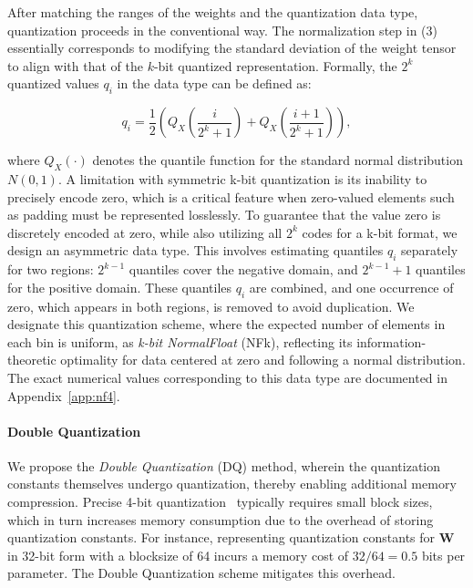 After matching the ranges of the weights and the quantization data type, quantization proceeds in the conventional way. The normalization step in (3) essentially corresponds to modifying the standard deviation of the weight tensor to align with that of the $k$-bit quantized representation. Formally, the $2^k$ quantized values $q_i$ in the data type can be defined as:

\begin{equation}
q_i  = \frac{1}{2}\left( Q_X\left(\frac{i}{2^k+1}\right) + Q_X\left(\frac{i+1}{2^k+1}\right)\right),
\end{equation}

where $Q_X(\cdot)$ denotes the quantile function for the standard normal distribution $N(0,1)$. A limitation with symmetric k-bit quantization is its inability to precisely encode zero, which is a critical feature when zero-valued elements such as padding must be represented losslessly. To guarantee that the value zero is discretely encoded at zero, while also utilizing all $2^k$ codes for a k-bit format, we design an asymmetric data type. This involves estimating quantiles $q_i$ separately for two regions: $2^{k-1}$ quantiles cover the negative domain, and $2^{k-1} + 1$ quantiles for the positive domain. These quantiles $q_i$ are combined, and one occurrence of zero, which appears in both regions, is removed to avoid duplication. We designate this quantization scheme, where the expected number of elements in each bin is uniform, as \emph{k-bit NormalFloat} (NFk), reflecting its information-theoretic optimality for data centered at zero and following a normal distribution. The exact numerical values corresponding to this data type are documented in Appendix~\ref{app:nf4}.

\paragraph{Double Quantization{}} 
We propose the \emph{Double Quantization} (DQ) method, wherein the quantization constants themselves undergo quantization, thereby enabling additional memory compression. Precise 4-bit quantization~\citep{dettmers2022case} typically requires small block sizes, which in turn increases memory consumption due to the overhead of storing quantization constants. For instance, representing quantization constants for $\mathbf{W}$ in 32-bit form with a blocksize of 64 incurs a memory cost of $32/64 = 0.5$ bits per parameter. The Double Quantization scheme mitigates this overhead.

